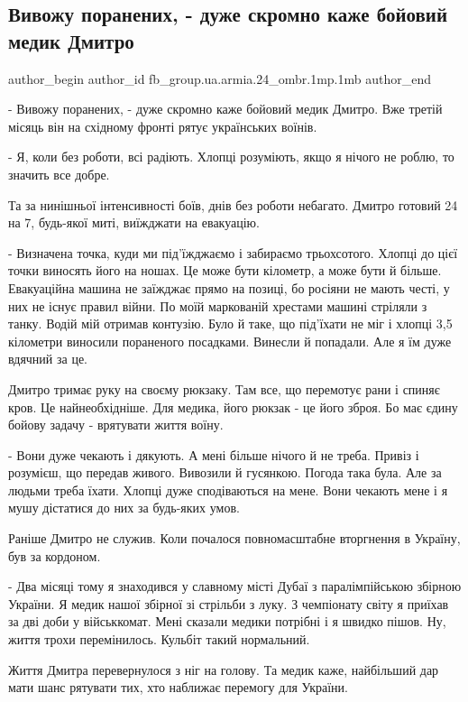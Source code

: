  
 
 
 
 
 
\subsection{Вивожу поранених, - дуже скромно каже бойовий медик Дмитро}
\label{sec:14_05_2022.fb.fb_group.ua.armia.24_ombr.1mp.1mb.1.medik}
 
\ifcmt
 author_begin
   author_id fb_group.ua.armia.24_ombr.1mp.1mb
 author_end
\fi

- Вивожу поранених, - дуже скромно каже бойовий медик Дмитро. Вже третій місяць
він на східному фронті рятує українських воїнів. 

- Я, коли без роботи, всі радіють. Хлопці розуміють, якщо я нічого не роблю, то
значить все добре.

Та за нинішньої інтенсивності боїв, днів без роботи небагато. Дмитро готовий 24
на 7, будь-якої миті, виїжджати на евакуацію.

- Визначена точка, куди ми під'їжджаємо і забираємо трьохсотого. Хлопці до цієї
точки виносять його на ношах. Це може бути кілометр, а може бути й більше.
Евакуаційна машина не заїжджає прямо на позиці, бо росіяни не мають честі, у
них не існує правил війни. По моїй маркованій хрестами машині стріляли з танку.
Водій мій отримав контузію. Було й таке, що під'їхати не міг і хлопці 3,5
кілометри виносили пораненого посадками. Винесли й попадали. Але я їм дуже
вдячний за це. 

Дмитро тримає руку на своєму рюкзаку. Там все, що перемотує рани і спиняє кров.
Це найнеобхідніше. Для медика, його рюкзак - це його зброя. Бо має єдину бойову
задачу - врятувати життя воїну. 

- Вони дуже чекають і дякують. А мені більше нічого й не треба. Привіз і
розумієш, що передав живого. Вивозили й гусянкою. Погода така була. Але за
людьми треба їхати. Хлопці дуже сподіваються на мене. Вони чекають мене і я
мушу дістатися до них за будь-яких умов.

Раніше Дмитро не служив. Коли почалося повномасштабне вторгнення в Україну, був
за кордоном.

- Два місяці тому я знаходився у славному місті Дубаї з паралімпійською збірною
України. Я медик нашої збірної зі стрільби з луку. З чемпіонату світу я приїхав
за дві доби у військкомат. Мені сказали медики  потрібні і я швидко пішов. Ну,
життя трохи перемінилось. Кульбіт такий нормальний.

Життя Дмитра перевернулося з ніг на голову. Та медик каже, найбільший дар мати
шанс рятувати тих, хто наближає перемогу для України.

